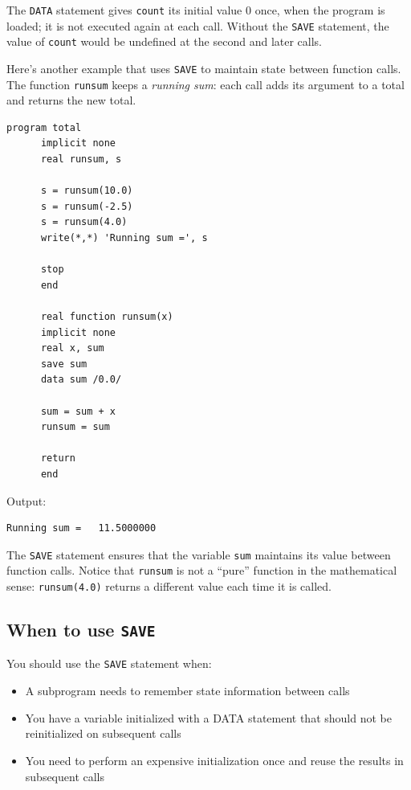 The \texttt{DATA} statement gives \texttt{count} its initial value 0 once, when the program is loaded; it is not executed again at each call. Without the \texttt{SAVE} statement, the value of \texttt{count} would be undefined at the second and later calls.

Here's another example that uses \texttt{SAVE} to maintain state between function calls. The function \texttt{runsum} keeps a \emph{running sum}: each call adds its argument to a total and returns the new total.

\begin{lstlisting}[style=fortran77]
      program total
      implicit none
      real runsum, s

      s = runsum(10.0)
      s = runsum(-2.5)
      s = runsum(4.0)
      write(*,*) 'Running sum =', s

      stop
      end

      real function runsum(x)
      implicit none
      real x, sum
      save sum
      data sum /0.0/

      sum = sum + x
      runsum = sum

      return
      end
\end{lstlisting}

Output:

\begin{lstlisting}[style=output]
 Running sum =   11.5000000
\end{lstlisting}

The \texttt{SAVE} statement ensures that the variable \texttt{sum} maintains its value between function calls. Notice that \texttt{runsum} is not a ``pure'' function in the mathematical sense: \texttt{runsum(4.0)} returns a different value each time it is called.

\subsection{When to use \texttt{SAVE}}

You should use the \texttt{SAVE} statement when:

\begin{itemize}
    \item A subprogram needs to remember state information between calls
    \item You have a variable initialized with a DATA statement that should not be reinitialized on subsequent calls
    \item You need to perform an expensive initialization once and reuse the results in subsequent calls
\end{itemize}

